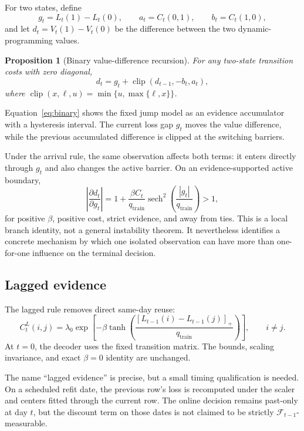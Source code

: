 \documentclass[11pt]{article}
\newcommand{\sech}{\operatorname{sech}}
\newcommand{\clip}{\operatorname{clip}}
\newtheorem{proposition}{Proposition}
\begin{document}
For two states, define
\begin{equation}
g_t=L_t(1)-L_t(0),\qquad
a_t=C_t(0,1),\qquad b_t=C_t(1,0),
\end{equation}
and let $d_t=V_t(1)-V_t(0)$ be the difference between the two dynamic-programming values.

\begin{proposition}[Binary value-difference recursion]
For any two-state transition costs with zero diagonal,
\begin{equation}
d_t=g_t+\clip(d_{t-1},-b_t,a_t),
\label{eq:binary}
\end{equation}
where $\clip(x,\ell,u)=\min\{u,\max\{\ell,x\}\}$.
\end{proposition}

Equation~\eqref{eq:binary} shows the fixed jump model as an evidence accumulator with a hysteresis interval. The current loss gap $g_t$ moves the value difference, while the previous accumulated difference is clipped at the switching barriers.

Under the arrival rule, the same observation affects both terms: it enters directly through $g_t$ and also changes the active barrier. On an evidence-supported active boundary,
\begin{equation}
\left|\frac{\partial d_t}{\partial g_t}\right|
=1+\frac{\beta C_t}{q_{\mathrm{train}}}
\sech^2\!\left(\frac{|g_t|}{q_{\mathrm{train}}}\right)>1,
\label{eq:amplification}
\end{equation}
for positive $\beta$, positive cost, strict evidence, and away from ties. This is a local branch identity, not a general instability theorem. It nevertheless identifies a concrete mechanism by which one isolated observation can have more than one-for-one influence on the terminal decision.

\subsection{Lagged evidence}

The lagged rule removes direct same-day reuse:
\begin{equation}
C_t^{L}(i,j)=\lambda_0\exp\left[
-\beta\tanh\left(
\frac{[L_{t-1}(i)-L_{t-1}(j)]_+}{q_{\mathrm{train}}}
\right)\right],
\qquad i\neq j.
\label{eq:lagged}
\end{equation}
At $t=0$, the decoder uses the fixed transition matrix. The bounds, scaling invariance, and exact $\beta=0$ identity are unchanged.

The name ``lagged evidence'' is precise, but a small timing qualification is needed. On a scheduled refit date, the previous row's loss is recomputed under the scaler and centers fitted through the current row. The online decision remains past-only at day $t$, but the discount term on those dates is not claimed to be strictly $\mathcal{F}_{t-1}$-measurable.
\end{document}
